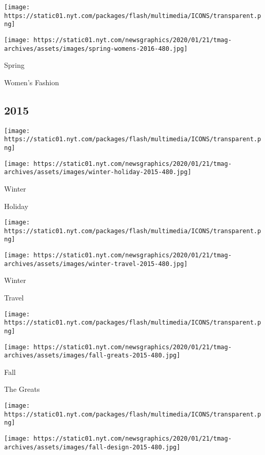 \href{https://www.nytimes.com/issue/t-magazine/2016/02/14/womens-fashion}{}

\texttt{[image: https://static01.nyt.com/packages/flash/multimedia/ICONS/transparent.png]}

\texttt{[image: https://static01.nyt.com/newsgraphics/2020/01/21/tmag-archives/assets/images/spring-womens-2016-480.jpg]}

Spring

Women's Fashion

\hypertarget{2015}{%
\subsection{2015}\label{2015}}

\href{https://www.nytimes.com/spotlight/t-magazine-issue-holiday-2015}{}

\texttt{[image: https://static01.nyt.com/packages/flash/multimedia/ICONS/transparent.png]}

\texttt{[image: https://static01.nyt.com/newsgraphics/2020/01/21/tmag-archives/assets/images/winter-holiday-2015-480.jpg]}

Winter

Holiday

\href{https://www.nytimes.com/spotlight/t-magazine-issue-winter-travel}{}

\texttt{[image: https://static01.nyt.com/packages/flash/multimedia/ICONS/transparent.png]}

\texttt{[image: https://static01.nyt.com/newsgraphics/2020/01/21/tmag-archives/assets/images/winter-travel-2015-480.jpg]}

Winter

Travel

\href{https://www.nytimes.com/spotlight/t-magazine-issue-the-greats}{}

\texttt{[image: https://static01.nyt.com/packages/flash/multimedia/ICONS/transparent.png]}

\texttt{[image: https://static01.nyt.com/newsgraphics/2020/01/21/tmag-archives/assets/images/fall-greats-2015-480.jpg]}

Fall

The Greats

\href{https://www.nytimes.com/interactive/2015/09/25/t-magazine/design-luxury-issue.html}{}

\texttt{[image: https://static01.nyt.com/packages/flash/multimedia/ICONS/transparent.png]}

\texttt{[image: https://static01.nyt.com/newsgraphics/2020/01/21/tmag-archives/assets/images/fall-design-2015-480.jpg]}

